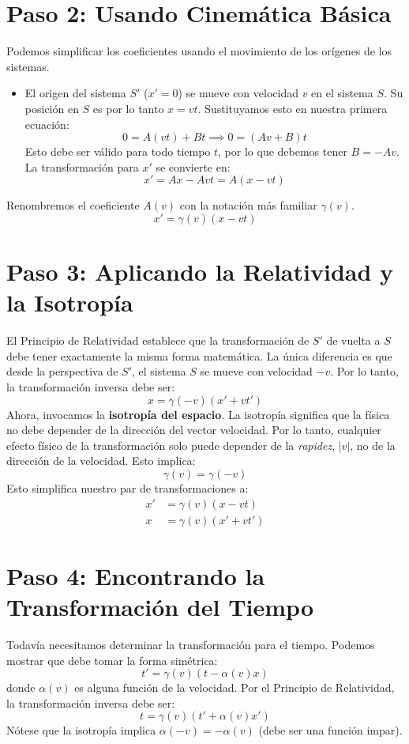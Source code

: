 \documentclass[11pt,a4paper]{book}
\begin{document}
\section{Paso 2: Usando Cinemática Básica}
Podemos simplificar los coeficientes usando el movimiento de los orígenes de los sistemas.
\begin{itemize}
    \item El origen del sistema $S'$ ($x'=0$) se mueve con velocidad $v$ en el sistema $S$. Su posición en $S$ es por lo tanto $x=vt$. Sustituyamos esto en nuestra primera ecuación:
    \[ 0 = A(vt) + Bt \implies 0 = (Av+B)t \]
    Esto debe ser válido para todo tiempo $t$, por lo que debemos tener $B = -Av$. La transformación para $x'$ se convierte en:
    \[ x' = Ax - Avt = A(x-vt) \]
\end{itemize}
Renombremos el coeficiente $A(v)$ con la notación más familiar $\gamma(v)$.
\begin{equation} \label{eq:x_prime}
x' = \gamma(v)(x - vt)
\end{equation}

\section{Paso 3: Aplicando la Relatividad y la Isotropía}
El Principio de Relatividad establece que la transformación de $S'$ de vuelta a $S$ debe tener exactamente la misma forma matemática. La única diferencia es que desde la perspectiva de $S'$, el sistema $S$ se mueve con velocidad $-v$. Por lo tanto, la transformación inversa debe ser:
\begin{equation} \label{eq:x}
x = \gamma(-v)(x' + vt')
\end{equation}
Ahora, invocamos la \textbf{isotropía del espacio}. La isotropía significa que la física no debe depender de la dirección del vector velocidad. Por lo tanto, cualquier efecto físico de la transformación solo puede depender de la \textit{rapidez}, $|v|$, no de la dirección de la velocidad. Esto implica:
\[ \gamma(v) = \gamma(-v) \]
Esto simplifica nuestro par de transformaciones a:
\begin{align*}
x' &= \gamma(v)(x - vt) \\
x &= \gamma(v)(x' + vt')
\end{align*}

\section{Paso 4: Encontrando la Transformación del Tiempo}
Todavía necesitamos determinar la transformación para el tiempo. Podemos mostrar que debe tomar la forma simétrica:
\begin{equation} \label{eq:t_prime}
t' = \gamma(v)(t - \alpha(v) x)
\end{equation}
donde $\alpha(v)$ es alguna función de la velocidad. Por el Principio de Relatividad, la transformación inversa debe ser:
\begin{equation} \label{eq:t}
t = \gamma(v)(t' + \alpha(v) x')
\end{equation}
Nótese que la isotropía implica $\alpha(-v) = -\alpha(v)$ (debe ser una función impar).
\end{document}
